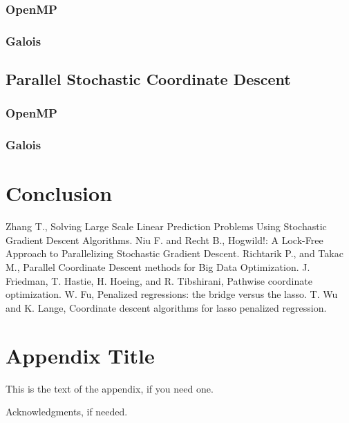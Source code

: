 \documentclass{sigplanconf}
\begin{document}
\subsubsection{OpenMP}
\subsubsection{Galois}
\subsection{Parallel Stochastic Coordinate Descent}
\subsubsection{OpenMP}
\subsubsection{Galois}

\section{Conclusion}



\begin{thebibliography}{}
\softraggedright

Zhang T., Solving Large Scale Linear Prediction Problems Using Stochastic Gradient Descent Algorithms.
Niu F. and Recht B., Hogwild!: A Lock-Free Approach to Parallelizing Stochastic Gradient Descent.
Richtarik P., and Takac M., Parallel Coordinate Descent methods for Big Data Optimization.
J. Friedman, T. Hastie, H. Hoeing, and R. Tibshirani, Pathwise coordinate optimization.
W. Fu, Penalized regressions: the bridge versus the lasso.
T. Wu and K. Lange, Coordinate descent algorithms for lasso penalized regression.

\end{thebibliography}

\appendix

\section{Appendix Title}

This is the text of the appendix, if you need one.

\acks

Acknowledgments, if needed.
\end{document}
